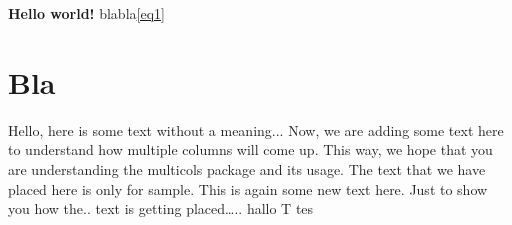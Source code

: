 \documentclass[twocolumn]{article}
\begin{document}
\textbf{Hello world!}
blabla\ref{eq1}
\section{Bla}
Hello, here is some text without a meaning... 
Now, we are adding some text here to understand how multiple columns will come up.
This way, we hope that you are understanding the multicols package and its usage.
The text that we have placed here is only for sample.
This is again some new text here. Just to show you how the..
text is getting placed…..
hallo
T
tes
\end{document}
